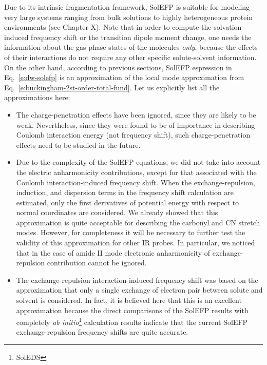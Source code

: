 \documentclass[a4paper,titlepage,twoside,fleqn,12pt]{book}
\begin{document}
\begin{refsection}
Due to its intrinsic fragmentation framework\citep{Gordon.Fedorov.Pruitt.Slipchenko.ChemRev.2012}, 
SolEFP is suitable for modeling very large systems
ranging from bulk solutions to highly heterogeneous
protein environments (see Chapter X). Note that in order
to compute the solvation\hyp{}induced frequency shift or the
transition dipole moment change, one needs the information
about the gas\hyp{}phase states of the molecules \emph{only}, 
because the effects of their interactions do not require 
any other specific solute\hyp{}solvent information.
On the other hand, according to 
previous sections, SolEFP espression in Eq.~\eqref{e:dw-solefp} 
is an approximation of the local mode approximation from
Eq.~\eqref{e:buckingham-2st-order-total-fund}. Let us 
explicitly list all the approximations here:
%
\begin{itemize}
 \item The charge\hyp{}penetration effects have been ignored, since they are likely to be weak. 
Nevertheless, since they were found to be of importance in describing Coulomb interaction energy 
(not frequency shift), such charge\hyp{}penetration effects need to be studied in the future.
 \item Due to the complexity of the SolEFP equations, we did not take into account the electric 
anharmonicity contributions, except for that associated with the Coulomb interaction\hyp{}induced 
frequency shift. When the exchange\hyp{}repulsion, induction, and dispersion terms in the frequency 
shift calculation are estimated, only the first derivatives of potential energy with respect 
to normal coordinates are considered. We already showed that this approximation is quite acceptable 
for describing the carbonyl and CN stretch modes.\citep{Blasiak.Cho.JCP.2014,Blasiak.Cho.JCP.2015,
Blasiak.Ritchie.Webb.Cho.XXX.2016}
However, for completeness it will be necessary to further test the validity of this approximation 
for other IR probes. In particular, we noticed that in the case of amide II mode
electronic anharmonicity of exchange\hyp{}repulsion contribution cannot be ignored.\citep{Blasiak.Cho.JCP.2015}
 \item The exchange\hyp{}repulsion interaction\hyp{}induced frequency shift was based on the approximation 
that only a single exchange of electron pair between solute and solvent is considered. 
In fact, it is believed here that this is an excellent approximation because the direct comparisons 
of the SolEFP results with completely \emph{ab initio}\footnote{SolEDS} calculation results indicate 
that the current SolEFP exchange\hyp{}repulsion frequency shifts are quite accurate.

\end{itemize}
\end{refsection}
\end{document}
